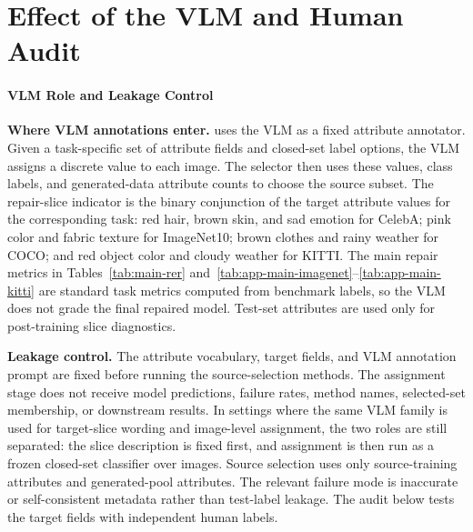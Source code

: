 \section{Effect of the VLM and Human Audit}
\label{app:vlm-human-audit}

\paragraph{VLM Role and Leakage Control}
\textbf{Where VLM annotations enter.}
\model uses the VLM as a fixed attribute annotator. Given a task-specific set of attribute fields and closed-set label options, the VLM assigns a discrete value to each image. The selector then uses these values, class labels, and generated-data attribute counts to choose the source subset. The repair-slice indicator is the binary conjunction of the target attribute values for the corresponding task: red hair, brown skin, and sad emotion for CelebA; pink color and fabric texture for ImageNet10; brown clothes and rainy weather for COCO; and red object color and cloudy weather for KITTI. The main repair metrics in Tables~\ref{tab:main-rer} and~\ref{tab:app-main-imagenet}--\ref{tab:app-main-kitti} are standard task metrics computed from benchmark labels, so the VLM does not grade the final repaired model. Test-set attributes are used only for post-training slice diagnostics.

\vspace{0.5em}
\textbf{Leakage control.}
The attribute vocabulary, target fields, and VLM annotation prompt are fixed before running the source-selection methods. The assignment stage does not receive model predictions, failure rates, method names, selected-set membership, or downstream results. In settings where the same VLM family is used for target-slice wording and image-level assignment, the two roles are still separated: the slice description is fixed first, and assignment is then run as a frozen closed-set classifier over images. Source selection uses only source-training attributes and generated-pool attributes. The relevant failure mode is inaccurate or self-consistent metadata rather than test-label leakage. The audit below tests the target fields with independent human labels.

